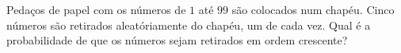 Pedaços de papel com os números de $1$ até $99$ são colocados num chapéu. Cinco números são retirados aleatóriamente do chapéu, um de cada vez. Qual é a probabilidade de que os números sejam retirados em ordem crescente?
